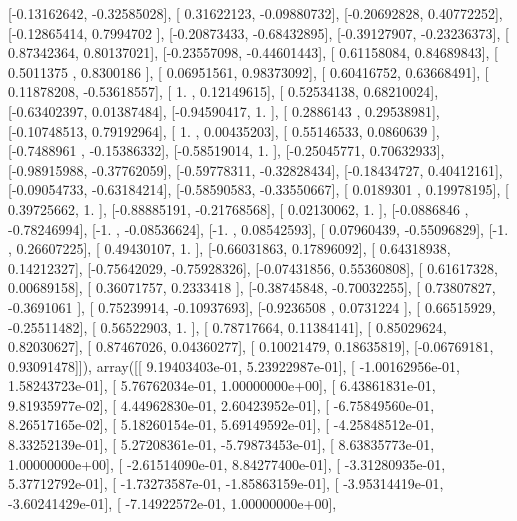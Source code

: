 \documentclass{article}
\begin{document}
       [-0.13162642, -0.32585028],
       [ 0.31622123, -0.09880732],
       [-0.20692828,  0.40772252],
       [-0.12865414,  0.7994702 ],
       [-0.20873433, -0.68432895],
       [-0.39127907, -0.23236373],
       [ 0.87342364,  0.80137021],
       [-0.23557098, -0.44601443],
       [ 0.61158084,  0.84689843],
       [ 0.5011375 ,  0.8300186 ],
       [ 0.06951561,  0.98373092],
       [ 0.60416752,  0.63668491],
       [ 0.11878208, -0.53618557],
       [ 1.        ,  0.12149615],
       [ 0.52534138,  0.68210024],
       [-0.63402397,  0.01387484],
       [-0.94590417,  1.        ],
       [ 0.2886143 ,  0.29538981],
       [-0.10748513,  0.79192964],
       [ 1.        ,  0.00435203],
       [ 0.55146533,  0.0860639 ],
       [-0.7488961 , -0.15386332],
       [-0.58519014,  1.        ],
       [-0.25045771,  0.70632933],
       [-0.98915988, -0.37762059],
       [-0.59778311, -0.32828434],
       [-0.18434727,  0.40412161],
       [-0.09054733, -0.63184214],
       [-0.58590583, -0.33550667],
       [ 0.0189301 ,  0.19978195],
       [ 0.39725662,  1.        ],
       [-0.88885191, -0.21768568],
       [ 0.02130062,  1.        ],
       [-0.0886846 , -0.78246994],
       [-1.        , -0.08536624],
       [-1.        ,  0.08542593],
       [ 0.07960439, -0.55096829],
       [-1.        ,  0.26607225],
       [ 0.49430107,  1.        ],
       [-0.66031863,  0.17896092],
       [ 0.64318938,  0.14212327],
       [-0.75642029, -0.75928326],
       [-0.07431856,  0.55360808],
       [ 0.61617328,  0.00689158],
       [ 0.36071757,  0.2333418 ],
       [-0.38745848, -0.70032255],
       [ 0.73807827, -0.3691061 ],
       [ 0.75239914, -0.10937693],
       [-0.9236508 ,  0.0731224 ],
       [ 0.66515929, -0.25511482],
       [ 0.56522903,  1.        ],
       [ 0.78717664,  0.11384141],
       [ 0.85029624,  0.82030627],
       [ 0.87467026,  0.04360277],
       [ 0.10021479,  0.18635819],
       [-0.06769181,  0.93091478]]), array([[  9.19403403e-01,   5.23922987e-01],
       [ -1.00162956e-01,   1.58243723e-01],
       [  5.76762034e-01,   1.00000000e+00],
       [  6.43861831e-01,   9.81935977e-02],
       [  4.44962830e-01,   2.60423952e-01],
       [ -6.75849560e-01,   8.26517165e-02],
       [  5.18260154e-01,   5.69149592e-01],
       [ -4.25848512e-01,   8.33252139e-01],
       [  5.27208361e-01,  -5.79873453e-01],
       [  8.63835773e-01,   1.00000000e+00],
       [ -2.61514090e-01,   8.84277400e-01],
       [ -3.31280935e-01,   5.37712792e-01],
       [ -1.73273587e-01,  -1.85863159e-01],
       [ -3.95314419e-01,  -3.60241429e-01],
       [ -7.14922572e-01,   1.00000000e+00],
\end{document}
